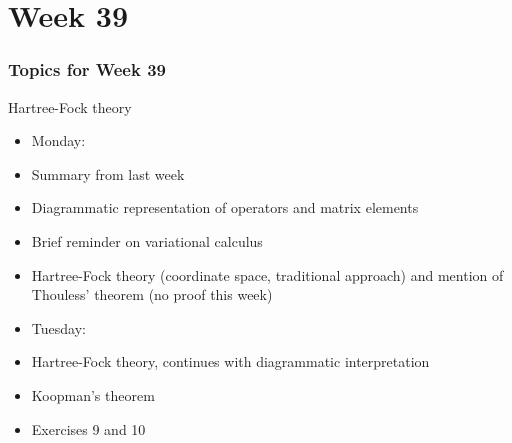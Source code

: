 \documentclass[compress]{beamer}
\begin{document}
\section[Week 39]{Week 39}

\frame
{
  \frametitle{Topics for Week 39}
  \begin{block}{Hartree-Fock theory}
\begin{itemize}
\item Monday:
\item Summary from last week
\item Diagrammatic representation of operators and matrix elements
\item Brief reminder on variational calculus
\item Hartree-Fock theory (coordinate space, traditional approach) and mention of Thouless' theorem (no proof this week)
\item Tuesday:
\item Hartree-Fock theory, continues with diagrammatic interpretation
\item Koopman's theorem
\item Exercises 9 and 10 
\end{itemize}
  \end{block}
} 
\end{document}

